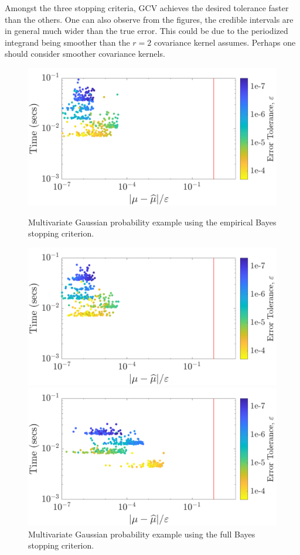 \documentclass{svjour3}                     %
\begin{document}
Amongst the three stopping criteria, GCV achieves the desired tolerance faster than the others. 
One can also observe from the figures, the credible intervals are in general much wider than the true error.
This could be due to the periodized integrand being smoother than the $r=2$ covariance kernel assumes. Perhaps one should consider smoother covariance kernels.

\begin{figure}
	\centering
	\includegraphics[width=0.98\linewidth]{"Lattice_MVN_guaranteed_time_MLE_C2sin_d2_r2_2019-Jun-27"}
	\caption[Guaranteed:]{Multivariate Gaussian probability example using the empirical Bayes stopping criterion.}
	\label{fig:mvn-guaranteed-MLE}
	\centering
	\includegraphics[width=0.98\linewidth]{"Lattice_MVN_guaranteed_time_full_C2sin_d2_r2_2019-Jun-27"}
	\caption[MVN guaranteed : FB]{Multivariate Gaussian probability example using the full Bayes stopping criterion.}
	\label{fig:mvn-guaranteed-FB}
	\centering
	\includegraphics[width=0.98\linewidth]{"Lattice_MVN_guaranteed_time_GCV_C2sin_d2_r2_2019-Jun-27"}

\end{figure}
\end{document}
